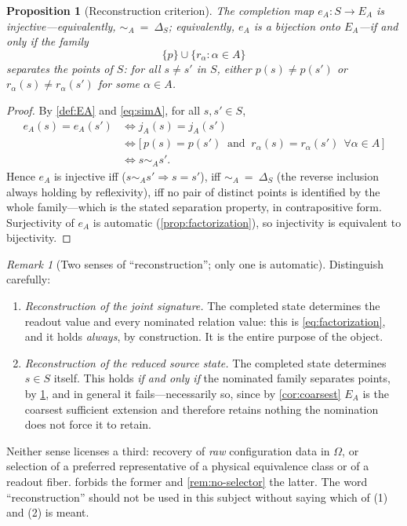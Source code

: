 \documentclass[11pt,reqno]{amsart}
\theoremstyle{plain}
\newtheorem{proposition}[theorem]{Proposition}
\theoremstyle{definition}
\theoremstyle{remark}
\newtheorem{remark}[theorem]{Remark}
\numberwithin{equation}{section}
\begin{document}
\begin{proposition}[Reconstruction criterion]
\label{prop:reconstruction}
The completion map $e_A\colon S\to E_A$ is injective---equivalently, $\sim_A\ =\ \Delta_S$;
equivalently, $e_A$ is a bijection onto $E_A$---if and only if the family
\begin{equation}
\label{eq:separating}
\{p\}\cup\{r_\alpha:\alpha\in A\}
\end{equation}
\emph{separates the points of $S$}: for all $s\neq s'$ in $S$, either $p(s)\neq p(s')$ or
$r_\alpha(s)\neq r_\alpha(s')$ for some $\alpha\in A$.
\end{proposition}

\begin{proof}
By \cref{def:EA} and \eqref{eq:simA}, for all $s,s'\in S$,
\begin{align*}
e_A(s)=e_A(s')
&\iff j_A(s)=j_A(s')\\
&\iff \bigl[\,p(s)=p(s')\ \text{ and }\ r_\alpha(s)=r_\alpha(s')\ \ \forall\alpha\in A\,\bigr]\\
&\iff s\sim_A s' .
\end{align*}
Hence $e_A$ is injective iff ($s\sim_A s'\Rightarrow s=s'$), iff $\sim_A\ =\ \Delta_S$ (the reverse
inclusion always holding by reflexivity), iff no pair of distinct points is identified by the whole
family---which is the stated separation property, in contrapositive form. Surjectivity of $e_A$ is
automatic (\cref{prop:factorization}), so injectivity is equivalent to bijectivity.
\end{proof}

\begin{remark}[Two senses of ``reconstruction''; only one is automatic]
\label{rem:two-reconstructions}
Distinguish carefully:
\begin{enumerate}
\item \emph{Reconstruction of the joint signature.} The completed state determines the readout value
and every nominated relation value: this is \eqref{eq:factorization}, and it holds \emph{always}, by
construction. It is the entire purpose of the object.
\item \emph{Reconstruction of the reduced source state.} The completed state determines $s\in S$
itself. This holds \emph{if and only if} the nominated family separates points, by
\cref{prop:reconstruction}, and in general it fails---necessarily so, since by \cref{cor:coarsest}
$E_A$ is the coarsest sufficient extension and therefore retains nothing the nomination does not
force it to retain.
\end{enumerate}
Neither sense licenses a third: recovery of \emph{raw} configuration data in $\Omega$, or selection of
a preferred representative of a physical equivalence class or of a readout fiber. 
forbids the former and \cref{rem:no-selector} the latter. The word ``reconstruction'' should not be
used in this subject without saying which of (1) and (2) is meant.
\end{remark}
\end{document}

